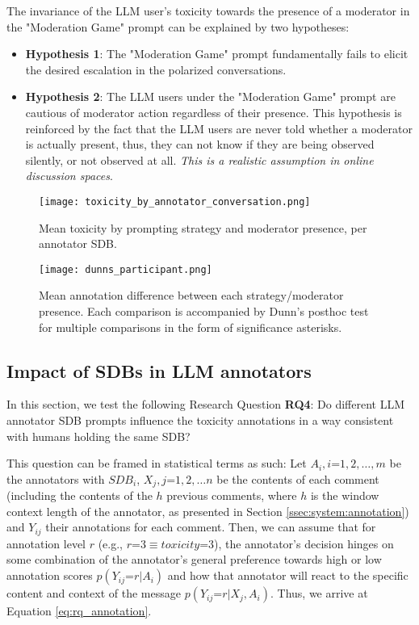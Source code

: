 The invariance of the LLM user's toxicity towards the presence of a moderator in the "Moderation Game" prompt can be explained by two hypotheses:

\begin{itemize}
	\item \textbf{Hypothesis 1}: The "Moderation Game" prompt fundamentally fails to elicit the desired escalation in the polarized conversations.
	
	\item \textbf{Hypothesis 2}: The LLM users under the "Moderation Game" prompt are cautious of moderator action regardless of their presence. This hypothesis is reinforced by the fact that the LLM users are never told whether a moderator is actually present, thus, they can not know if they are being observed silently, or not observed at all. \textit{This is a realistic assumption in online discussion spaces}.
\end{itemize}

\begin{figure}
	\centering
	\texttt{[image: toxicity\_by\_annotator\_conversation.png]}
	\caption{Mean toxicity by prompting strategy and moderator presence, per annotator \ac{SDB}.}
	\label{fig::toxicity-strategy}
\end{figure}

\begin{figure}
	\centering
	\texttt{[image: dunns\_participant.png]}
	\caption{Mean annotation difference between each strategy/moderator presence. Each comparison is accompanied by Dunn's posthoc test for multiple comparisons in the form of significance asterisks.}
	\label{fig::toxicity-strategy-significance}
\end{figure}



\subsection{Impact of SDBs in LLM annotators}
\label{ssec:evaluation:annotators}

In this section, we test the following Research Question \textbf{RQ4}: Do different LLM annotator \ac{SDB} prompts influence the toxicity annotations in a way consistent with humans holding the same \ac{SDB}?

This question can be framed in statistical terms as such: Let $A_i, i\text{=}1,2,\dots ,m$ be the annotators with $SDB_i$, $X_j, j\text{=}1,2,\dots n$ be the contents of each comment (including the contents of the $h$ previous comments, where $h$ is the window context length of the annotator, as presented in Section \ref{ssec:system:annotation}) and $Y_{ij}$ their annotations for each comment.
Then, we can assume that for annotation level $r$ (e.g., $r \text{=} 3 \equiv toxicity\text{=}3$), the annotator's decision hinges on some combination of the annotator's general preference towards high or low annotation scores $p(Y_{ij} \text{=} r | A_i)$ and how that annotator will react to the specific content and context of the message $p(Y_{ij} \text{=} r | X_j, A_i)$. Thus, we arrive at Equation \ref{eq:rq_annotation}.


